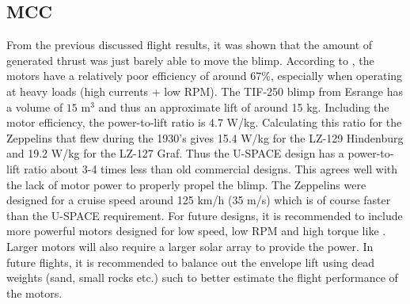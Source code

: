 \subsection{MCC}
From the previous discussed flight results, it was shown that the amount of generated thrust was just barely able to move the blimp. According to \cite{website:ModelMotors}, the motors have a relatively poor efficiency of around 67\%, especially when operating at heavy loads (high currents + low \ac{RPM}). The TIF-250 blimp from Esrange has a volume of $15$ m$^3$ and thus an approximate lift of around 15 kg. Including the motor efficiency, the power-to-lift ratio is 4.7 W/kg. Calculating this ratio for the Zeppelins that flew during the 1930's\cite{website:graf_zeppelin} gives 15.4 W/kg for the LZ-129 Hindenburg and 19.2 W/kg for the LZ-127 Graf. Thus the U-SPACE design has a power-to-lift ratio about 3-4 times less than old commercial designs. This agrees well with the lack of motor power to properly propel the blimp. The Zeppelins were designed for a cruise speed around 125 km/h (35 m/s) which is of course faster than the U-SPACE requirement. For future designs, it is recommended to include more powerful motors designed for low speed, low \ac{RPM} and high torque like \cite{website:ModelMotors_AXI5360}. Larger motors will also require a larger solar array to provide the power.
In future flights, it is recommended to balance out the envelope lift using dead weights (sand, small rocks etc.) such to better estimate the flight performance of the motors.


